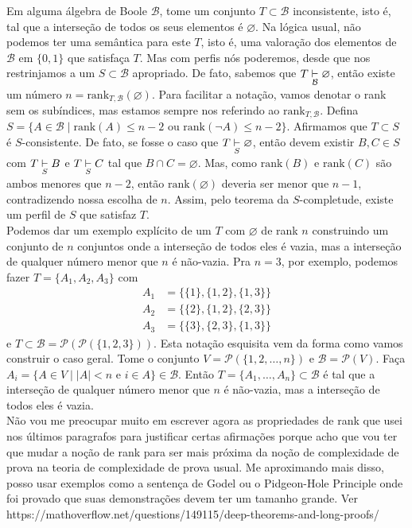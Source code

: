 \documentclass[11pt]{article}
\theoremstyle{definition}
\theoremstyle{definition}
\theoremstyle{definition}
\theoremstyle{definition}
\theoremstyle{definition}
\theoremstyle{definition}
\theoremstyle{definition}
\theoremstyle{definition}
\theoremstyle{definition}
\theoremstyle{definition}
\newtheorem*{example*}{Exemplo}
\newenvironment{exemplo*}{
\definecolor{shadecolor}{HTML}{b9e6d3}
\begin{shaded}
\begin{example*}
}
{
\end{example*}
\end{shaded}
}
\theoremstyle{definition}
\theoremstyle{definition}
\theoremstyle{definition}
\theoremstyle{definition}
\begin{document}
\begin{exemplo*}
Em alguma álgebra de Boole $\mathcal{B}$, tome um conjunto $T \subset \mathcal{B}$ inconsistente, isto é, tal que a interseção de todos os seus elementos é $\varnothing$. Na lógica usual, não podemos ter uma semântica para este $T$, isto é, uma valoração dos elementos de $\mathcal{B}$ em $\{0,1\}$ que satisfaça $T$. Mas com perfis nós poderemos, desde que nos restrinjamos a um $S \subset \mathcal{B}$ apropriado. De fato, sabemos que $T \underset{\mathcal{B}}{\vdash} \varnothing$, então existe um número $n = \text{rank}_{T,\mathcal{B}}(\varnothing)$. Para facilitar a notação, vamos denotar o rank sem os subíndices, mas estamos sempre nos referindo ao $\text{rank}_{T,\mathcal{B}}$. Defina $S = \{A \in \mathcal{B} \mid \text{rank}(A) \leq n - 2 \text{ ou } \text{rank}(\lnot A) \leq n - 2\}$. Afirmamos que $T \subset S$ é $S$-consistente. De fato, se fosse o caso que $T \underset{S}{\vdash} \varnothing$, então devem existir $B,C \in S$ com $T \underset{S}{\vdash} B$ e $T \underset{S}{\vdash} C$ tal que $B \cap C  = \varnothing$. Mas, como $\text{rank}(B)$ e $\text{rank}(C)$ são ambos menores que $n-2$, então $\text{rank}(\varnothing)$ deveria ser menor que $n-1$, contradizendo nossa escolha de $n$. Assim, pelo teorema da $S$-completude, existe um perfil de $S$ que satisfaz $T$.\\


Podemos dar um exemplo explícito de um $T$ com $\varnothing$ de rank $n$ construindo um conjunto de $n$ conjuntos onde a interseção de todos eles é vazia, mas a interseção de qualquer número menor que $n$ é não-vazia. Pra $n = 3$, por exemplo, podemos fazer $T = \{A_1,A_2,A_3\}$ com 
 \begin{align*}
 A_1 &= \{\{1\},\{1,2\},\{1,3\}\}                       \\
 A_2 &= \{\{2\}, \{1,2\}, \{2,3\} \}          \\
 A_3 &= \{\{3\},\{2,3\}, \{1,3\}\}          
 \end{align*}
e $T \subset \mathcal{B} = \mathcal{P}(\mathcal{P}(\{1,2,3\}))$. Esta notação esquisita vem da forma como vamos construir o caso geral. Tome o conjunto $V = \mathcal{P}(\{1,2,\dots, n\})$ e $\mathcal{B} = \mathcal{P}(V)$. Faça $A_i = \{A \in V \mid |A| < n \text{ e } i \in A \} \in \mathcal{B}$. Então $T = \{A_1, \dots, A_n\} \subset \mathcal{B}$ é tal que a interseção de qualquer número menor que $n$ é não-vazia, mas a interseção de todos eles é vazia.\\

Não vou me preocupar muito em escrever agora as propriedades de rank que usei nos últimos paragrafos para justificar certas afirmações porque acho que vou ter que mudar a noção de rank para ser mais próxima da noção de complexidade de prova na teoria de complexidade de prova usual. Me aproximando mais disso, posso usar exemplos como a sentença de Godel ou o Pidgeon-Hole Principle onde foi provado que suas demonstrações devem ter um tamanho grande. Ver https://mathoverflow.net/questions/149115/deep-theorems-and-long-proofs/
\end{exemplo*}
\end{document}
